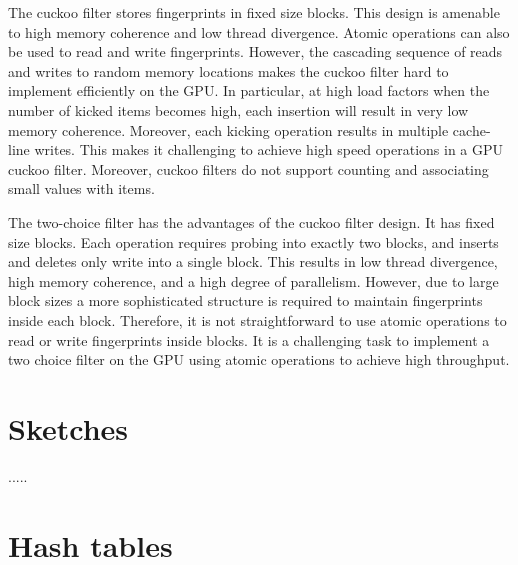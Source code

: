 The cuckoo filter stores fingerprints in fixed size blocks. This design is
amenable to high memory coherence and low thread divergence. Atomic operations
can also be used to read and write fingerprints. However, the cascading sequence
of reads and writes to random memory locations makes the cuckoo filter hard to
implement efficiently on the GPU\@. In particular, at high load factors when the
number of kicked items becomes high, each insertion will result in very low
memory coherence. Moreover, each kicking operation results in multiple
cache-line writes. This makes it challenging to achieve high speed operations in
a GPU cuckoo filter. Moreover, cuckoo filters do not support counting and
associating small values with items.

The two-choice filter has the advantages of the cuckoo filter design. It has
fixed size blocks. Each operation requires probing into exactly two blocks, and
inserts and deletes only write into a single block. This results in low thread
divergence, high memory coherence, and a high degree of parallelism. However,
due to large block sizes a more sophisticated structure is required to maintain
fingerprints inside each block. Therefore, it is not straightforward to use
atomic operations to read or write fingerprints inside blocks. It is a
challenging task to implement a two choice filter on the GPU using atomic
operations to achieve high throughput.

\section{Sketches}



.....

\section{Hash tables}
\label{sec:hash-tables}



